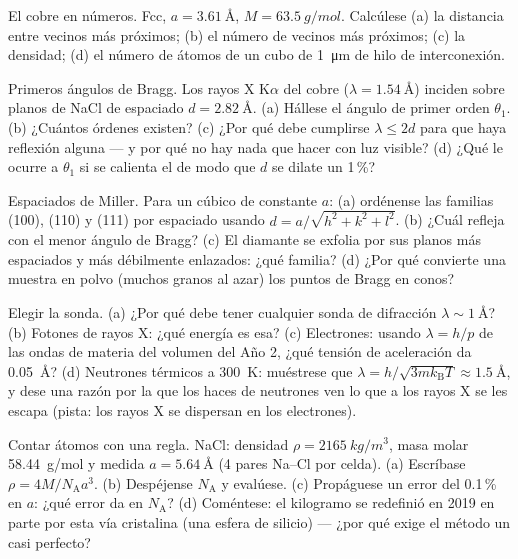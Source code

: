 \begin{exercise}[$\star$]\label{exo:b3:crystalline-solids:2}
El cobre en números. Fcc, $a = \qty{3.61}{\angstrom}$, $M =
\qty{63.5}{g/mol}$. Calcúlese (a) la distancia entre vecinos más próximos;
(b) el número de vecinos más próximos; (c) la densidad; (d) el
número de átomos de un cubo de \qty{1}{\micro m} de hilo de interconexión.
\end{exercise}

\begin{exercise}[$\star$]\label{exo:b3:crystalline-solids:3}
Primeros ángulos de Bragg. Los rayos X K$\alpha$ del cobre
($\lambda = \qty{1.54}{\angstrom}$) inciden sobre planos de NaCl de espaciado
$d = \qty{2.82}{\angstrom}$. (a) Hállese el ángulo de primer orden
$\theta_1$. (b) ¿Cuántos órdenes existen? (c) ¿Por qué debe cumplirse
$\lambda \le 2d$ para que haya reflexión alguna --- y por qué no hay nada que hacer con luz
visible? (d) ¿Qué le ocurre a $\theta_1$ si se calienta el 
de modo que $d$ se dilate un 1\,\%?
\end{exercise}

\begin{exercise}[$\star$]\label{exo:b3:crystalline-solids:4}
Espaciados de Miller. Para un  cúbico de constante $a$: (a) ordénense las
familias (100), (110) y (111) por espaciado usando
$d = a/\sqrt{h^2+k^2+l^2}$. (b) ¿Cuál refleja con el menor
ángulo de Bragg? (c) El diamante se exfolia por sus planos más espaciados y
más débilmente enlazados: ¿qué familia? (d) ¿Por qué convierte una muestra en polvo
(muchos granos al azar) los puntos de Bragg en conos?
\end{exercise}

\begin{exercise}[$\star\star$]\label{exo:b3:crystalline-solids:5}
Elegir la sonda. (a) ¿Por qué debe tener cualquier sonda de difracción
$\lambda \sim \qty{1}{\angstrom}$? (b) Fotones de rayos X: ¿qué energía
es esa? (c) Electrones: usando $\lambda = h/p$ de las ondas de materia del
volumen del Año 2, ¿qué tensión de aceleración da
\qty{0.05}{\angstrom}? (d) Neutrones térmicos a \qty{300}{K}: muéstrese que
$\lambda = h/\sqrt{3mk_{\text{B}}T} \approx \qty{1.5}{\angstrom}$,
y dese una razón por la que los haces de neutrones ven lo que a los rayos X se les escapa (pista:
los rayos X se dispersan en los electrones).
\end{exercise}

\begin{exercise}[$\star\star$]\label{exo:b3:crystalline-solids:6}
Contar átomos con una regla. NaCl: densidad
$\rho = \qty{2165}{kg/m^3}$, masa molar \qty{58.44}{g/mol} y
 medida $a = \qty{5.64}{\angstrom}$ (4 pares Na--Cl
por celda). (a) Escríbase $\rho = 4M/N_{\text{A}}a^3$. (b) Despéjense
$N_{\text{A}}$ y evalúese. (c) Propáguese un error del 0.1\,\% en
$a$: ¿qué error da en $N_{\text{A}}$? (d) Coméntese: el kilogramo
se redefinió en 2019 en parte por esta vía cristalina (una esfera de
silicio) --- ¿por qué exige el método un  casi perfecto?
\end{exercise}

